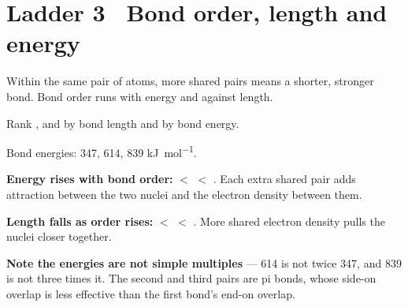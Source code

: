 \documentclass{apchem-worksheet}
\begin{document}
\section*{\sffamily Ladder 3 \textbullet\ Bond order, length and energy}

Within the same pair of atoms, more shared pairs means a shorter, stronger
bond. Bond order runs with energy and against length.

\begin{workedexample}
Rank ,  and  by bond length and by bond energy.

Bond energies: 347, 614, 839 \si{\kilo\joule\per\mole}.

\textbf{Energy rises with bond order:}  $<$  $<$
. Each extra shared pair adds attraction between the two nuclei
and the electron density between them.

\textbf{Length falls as order rises:}  $<$  $<$ .
More shared electron density pulls the nuclei closer together.

\textbf{Note the energies are not simple multiples} --- 614 is not twice
347, and 839 is not three times it. The second and third pairs are pi
bonds, whose side-on overlap is less effective than the first bond's
end-on overlap.
\end{workedexample}
\end{document}
